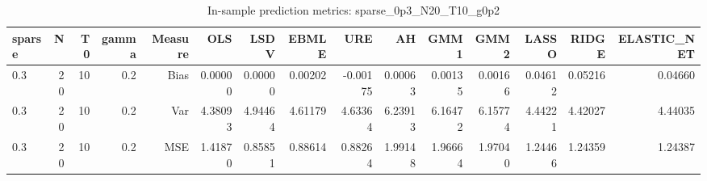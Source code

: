 \begin{table}[!htbp]\centering
\caption{In-sample prediction metrics: sparse_0p3_N20_T10_g0p2}
\label{tab:table2_sparse_0p3_N20_T10_g0p2}
\begin{tabular}{lrrrrrrrrrrrrrr}
\hline
sparse & N & T0 & gamma & Measure & OLS & LSDV & EBMLE & URE & AH & GMM1 & GMM2 & LASSO & RIDGE & ELASTIC_NET \\
\hline
0.3 & 20 & 10 & 0.2 & Bias & 0.00000 & 0.00000 & 0.00202 & -0.00175 & 0.00063 & 0.00135 & 0.00166 & 0.04612 & 0.05216 & 0.04660 \\
0.3 & 20 & 10 & 0.2 & Var & 4.38093 & 4.94464 & 4.61179 & 4.63364 & 6.23913 & 6.16472 & 6.15774 & 4.44221 & 4.42027 & 4.44035 \\
0.3 & 20 & 10 & 0.2 & MSE & 1.41870 & 0.85851 & 0.88614 & 0.88264 & 1.99148 & 1.96664 & 1.97040 & 1.24466 & 1.24359 & 1.24387 \\
\hline
\end{tabular}
\end{table}

